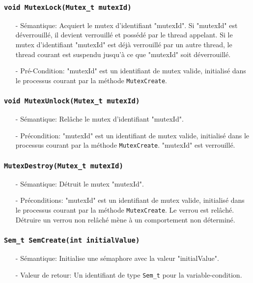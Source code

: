 \documentclass[11pt]{article}
\theoremstyle{definition}
\theoremstyle{definition}
\begin{document}
\subsubsection{\texttt{void MutexLock(Mutex\_t mutexId)}}
\begin{itemize}
\item[-]Sémantique: Acquiert le mutex d'identifiant "mutexId". Si "mutexId" est déverrouillé, il devient verrouillé
  et possédé par le thread appelant. Si le mutex d'identifiant "mutexId" est déjà verrouillé par un autre thread,
  le thread courant est suspendu jusqu'à ce que "mutexId" soit déverrouillé.
\item[-]Pré-Condition: "mutexId" est un identifiant de mutex valide, initialisé dans le processus
  courant par la méthode \texttt{MutexCreate}.
\end{itemize}

\subsubsection{\texttt{void MutexUnlock(Mutex\_t mutexId)}}
\begin{itemize}
\item[-]Sémantique: Relâche le mutex d'identifiant "mutexId".
\item[-]Précondition: "mutexId" est un identifiant de mutex valide, initialisé dans le processus
  courant par la méthode \texttt{MutexCreate}. "mutexId" est verrouillé.
\end{itemize}

\subsubsection{\texttt{MutexDestroy(Mutex\_t mutexId)}}
\begin{itemize}
\item[-]Sémantique: Détruit le mutex "mutexId".
\item[-]Préconditions: "mutexId" est un identifiant de mutex valide, initialisé dans le processus
  courant par la méthode \texttt{MutexCreate}.
  Le verrou est relâché. Détruire un verrou non relâché mène à un comportement
  non déterminé.
\end{itemize}

\subsubsection{\texttt{Sem\_t SemCreate(int initialValue)}}
\begin{itemize}
\item[-]Sémantique: Initialise une sémaphore avec la valeur "initialValue".
\item[-]Valeur de retour: Un identifiant de type \texttt{Sem\_t} pour la variable-condition.
\end{itemize}
\end{document}
